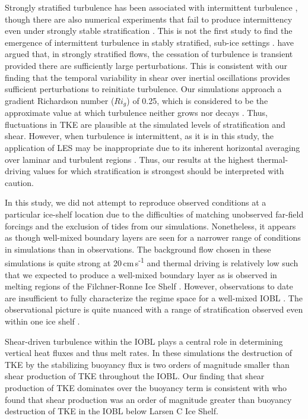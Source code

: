 \documentclass[draft]{styles/agujournal2019}
\begin{document}
Strongly stratified turbulence has been associated with intermittent turbulence \cite{nieuwstadt_direct_2005, wiel_cessation_2012}, though there are also numerical experiments that fail to produce intermittency even under strongly stable stratification \cite{arya_buoyancy_1975, komori_turbulence_1983}. This is not the first study to find the emergence of intermittent turbulence in stably stratified, sub-ice settings \cite{vreugdenhil_stratification_2019}.  have argued that, in strongly stratified flows, the cessation of turbulence is transient provided there are sufficiently large perturbations. This is consistent with our finding that the temporal variability in shear over inertial oscillations provides sufficient perturbations to reinitiate turbulence. Our simulations approach a gradient Richardson number ($Ri_g$) of 0.25, which is considered to be the approximate value at which turbulence neither grows nor decays \cite{rohr_growth_1988, holt_numerical_1992}. Thus, fluctuations in TKE are plausible at the simulated levels of stratification and shear. However, when turbulence is intermittent, as it is in this study, the application of LES may be inappropriate due to its inherent horizontal averaging over laminar and turbulent regions \cite{stoll_large-eddy_2008}. Thus, our results at the highest thermal-driving values for which stratification is strongest should be interpreted with caution. 

In this study, we did not attempt to reproduce observed conditions at a particular ice-shelf location due to the difficulties of matching unobserved far-field forcings and the exclusion of tides from our simulations. Nonetheless, it appears as though well-mixed boundary layers are seen for a narrower range of conditions in simulations than in observations. The background flow chosen in these simulations is quite strong at 20\,cm\,s\textsuperscript{-1} and thermal driving is relatively low such that we expected to produce a well-mixed boundary layer as is observed in melting regions of the Filchner-Ronne Ice Shelf \cite{nicholls_oceanographic_2001}. However, observations to date are insufficient to fully characterize the regime space for a well-mixed IOBL \cite{malyarenko_synthesis_2020}. The observational picture is quite nuanced with a range of stratification observed even within one ice shelf \cite{hattermann_two_2012}. 

Shear-driven turbulence within the IOBL plays a central role in determining vertical heat fluxes and thus melt rates. In these simulations the destruction of TKE by the stabilizing buoyancy flux is two orders of magnitude smaller than shear production of TKE throughout the IOBL. Our finding that shear production of TKE dominates over the buoyancy term is consistent with  who found that shear production was an order of magnitude greater than buoyancy destruction of TKE in the IOBL below Larsen C Ice Shelf. 
\end{document}
